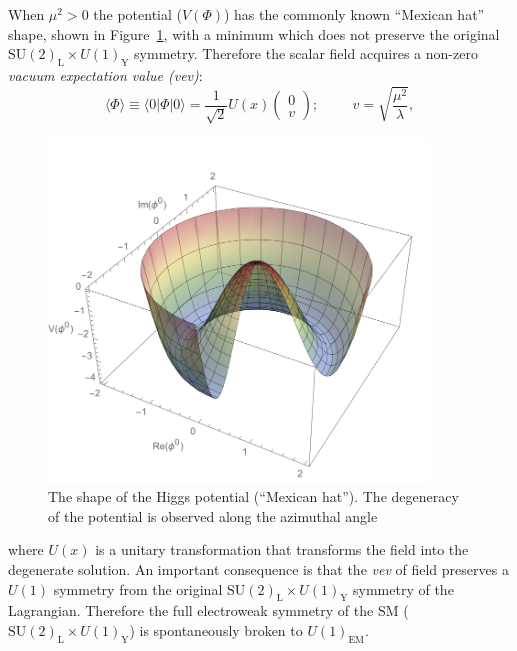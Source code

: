 When $\mu^{2} > 0$ the potential ($V(\Phi)$) has the commonly known
``Mexican hat'' shape, shown in Figure~\ref{fig:MexHat}, with a minimum which does not preserve the
original $\mathrm{SU(2)_{L}}\times U(1)_{\mathrm{Y}}$
symmetry. Therefore the scalar field acquires a non-zero
\textit{vacuum expectation value (vev)}:
\begin{equation}
\label{eq:vev}
\langle \Phi \rangle \equiv \langle 0 | \Phi | 0\rangle = \frac{1}{\sqrt{2}}U(x) \begin{pmatrix} 0\\
  v\end{pmatrix}; \hspace{1cm}v = \sqrt{\frac{\mu^{2}}{\lambda}},
\end{equation}

\begin{figure}
 \centering
\includegraphics[width=0.9\textwidth]{IntroFigures/HiggsPotential.pdf}
 \caption{The shape of the Higgs potential (``Mexican hat''). The
   degeneracy of the potential is observed along the azimuthal angle\label{fig:MexHat}}
\end{figure}

where $U(x)$ is a unitary transformation that transforms the field
into the degenerate solution. An important consequence is that the
\textit{vev} of field preserves a $U(1)$ symmetry from the original
$\mathrm{SU(2)_{L}}\times U(1)_{\mathrm{Y}}$ symmetry of the
Lagrangian. Therefore the full electroweak symmetry of the SM
($\mathrm{SU(2)_{L}}\times U(1)_{\mathrm{Y}}$) is spontaneously broken
to $U(1)_{\mathrm{EM}}$.

